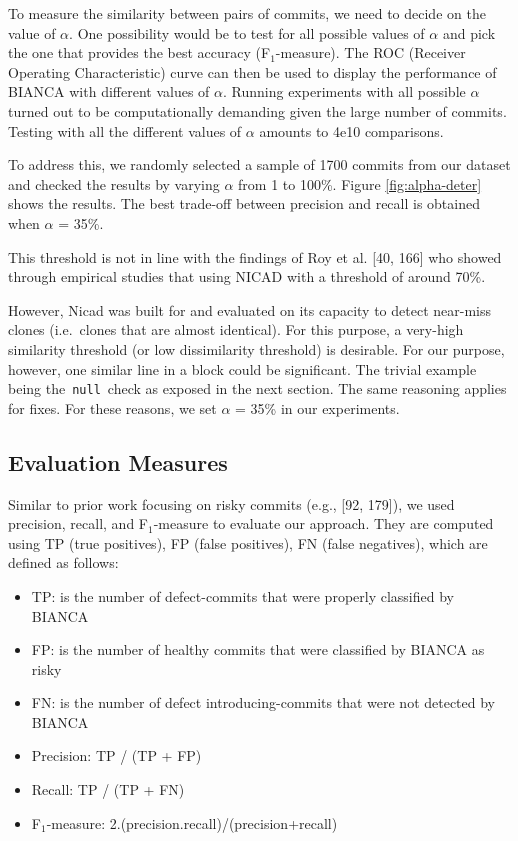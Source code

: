 \documentclass[12pt]{report}
\providecommand{\tightlist}{%
  \setlength{\itemsep}{0pt}\setlength{\parskip}{0pt}}
\begin{document}


To measure the similarity between pairs of commits, we need to decide on
the value of \(\alpha\). One possibility would be to test for all
possible values of \(\alpha\) and pick the one that provides the best
accuracy (F\(_1\)-measure). The ROC (Receiver Operating Characteristic)
curve can then be used to display the performance of BIANCA with
different values of \(\alpha\). Running experiments with all possible
\(\alpha\) turned out to be computationally demanding given the large
number of commits. Testing with all the different values of \(\alpha\)
amounts to 4e10 comparisons.

To address this, we randomly selected a sample of 1700 commits from our
dataset and checked the results by varying \(\alpha\) from 1 to 100\%.
Figure \ref{fig:alpha-deter} shows the results. The best trade-off
between precision and recall is obtained when \(\alpha\) = 35\%.

This threshold is not in line with the findings of Roy et al. {[}40,
166{]} who showed through empirical studies that using NICAD with a
threshold of around 70\%.

However, Nicad was built for and evaluated on its capacity to detect
near-miss clones (i.e.~clones that are almost identical). For this
purpose, a very-high similarity threshold (or low dissimilarity
threshold) is desirable. For our purpose, however, one similar line in a
block could be significant. The trivial example being
the~\lstinline!null!~check as exposed in the next section. The same
reasoning applies for fixes. For these reasons, we set \(\alpha\) = 35\%
in our experiments.

\subsection{Evaluation Measures}\label{evaluation-measures}

Similar to prior work focusing on risky commits (e.g., {[}92, 179{]}),
we used precision, recall, and F\(_1\)-measure to evaluate our approach.
They are computed using TP (true positives), FP (false positives), FN
(false negatives), which are defined as follows:

\begin{itemize}
\tightlist
\item
  TP: is the number of defect-commits that were properly classified by
  BIANCA
\item
  FP: is the number of healthy commits that were classified by BIANCA as
  risky
\item
  FN: is the number of defect introducing-commits that were not detected
  by BIANCA
\item
  Precision: TP / (TP + FP)
\item
  Recall: TP / (TP + FN)
\item
  F\(_1\)-measure: 2.(precision.recall)/(precision+recall)
\end{itemize}
\end{document}
